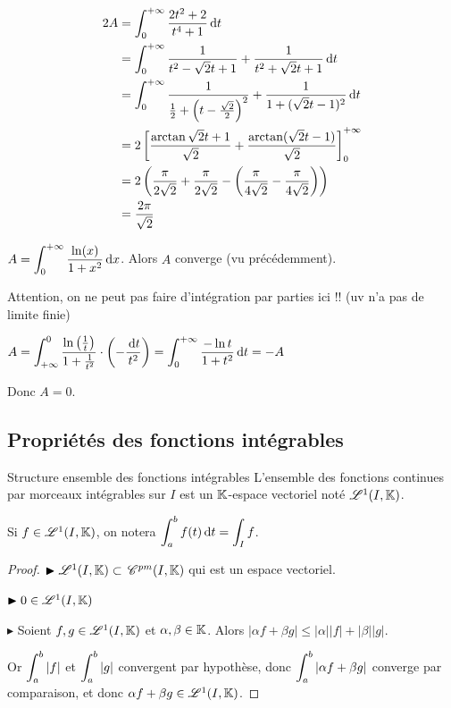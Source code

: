 \begin{exemple}
    \begin{align}
        2A & = \displaystyle \int_{0}^{+ \infty} \frac{2t^2 + 2}{t^4 + 1} \,\mathrm{d}t  \\
        & = \int_{0 }^{+ \infty   } \frac 1 {t^2 - \sqrt 2 t + 1} + \frac{ 1 }{ t^2 + \sqrt 2 t + 1 } \,\mathrm{d}t \\
        & = \int_{0}^{+ \infty   } \frac 1 {\frac 1 2 + \left( t - \frac{\sqrt 2 }{2} \right)^2} + \frac 1 {1 + (\sqrt 2 t - 1)^2} \,\mathrm{d}t \\
        & = 2 \left[ \frac{\arctan \sqrt 2 t + 1}{\sqrt 2  } + \frac{\arctan (\sqrt 2 t - 1)}{ \sqrt 2  } \right]_0^{+ \infty} \\
        & = 2 \left( \frac \pi {2 \sqrt 2} + \frac \pi {2 \sqrt 2} - \left( \frac \pi {4 \sqrt 2} - \frac \pi {4 \sqrt 2} \right) \right) \\
        & = \frac{2 \pi }{ \sqrt 2 }
    \end{align}
\end{exemple}


\begin{exemple}
    $A = \displaystyle \int_{0}^{+ \infty   } \frac{\ln (x) }{1 + x^2} \,\mathrm{d}x$. Alors $A$ converge (vu précédemment). 

    Attention, on ne peut pas faire d'intégration par parties ici !! (uv n'a pas de limite finie)

    $A = \displaystyle \int_{+ \infty }^{0 } \frac{\ln \left( \frac 1 t \right) }{1 + \frac 1 {t^2} } \cdot \left( - \frac {\,\mathrm{d}t} {t^2} \right) = \int_0^{+ \infty   } \frac{- \ln t }{1 + t^2} \,\mathrm{d}t = - A$

    Donc $A = 0$. 
\end{exemple}



\subsection{Propriétés des fonctions intégrables }

\begin{proposition}{Structure ensemble des fonctions intégrables}{}
    L'ensemble des fonctions continues par morceaux intégrables sur $I$ est un 
    $\mathbb{K}$-espace vectoriel noté $\mathscr L^1(I, \mathbb{K})$.

    Si $f \in \mathscr L^1(I, \mathbb{K})$, on notera $\displaystyle \int_{a}^{b } f(t) \,\mathrm{d}t = \int_{I } f$.
\end{proposition}

\begin{proof}
    $\blacktriangleright \mathscr L^1(I, \mathbb{K}) \subset \,\mathscr C^{pm}(I, \mathbb{K})$ qui est un espace vectoriel. 

    $\blacktriangleright 0 \in \mathscr L^1(I, \mathbb{K})$ 

    $\blacktriangleright$ Soient $f, g \in \mathscr L^1(I, \mathbb{K})$ et $\alpha, \beta \in \mathbb{K}$. Alors 
    $\mid \alpha f + \beta g \mid \leqslant |\alpha| |f| + |\beta| |g|$.

    Or $\displaystyle \int_{a }^{b } |f|$ et $\displaystyle \int_{a }^{b } |g|$ convergent par hypothèse, 
    donc $\displaystyle \int_{a }^{b } |\alpha f + \beta g|$ converge par comparaison, 
    et donc $\alpha f + \beta g \in \mathscr L^1(I, \mathbb{K})$.
\end{proof}


